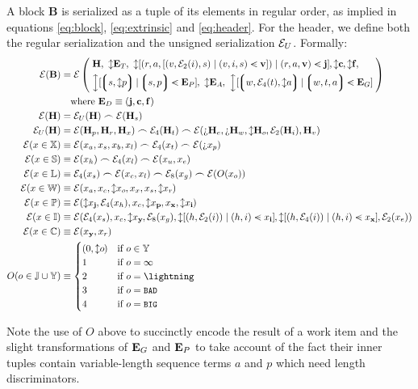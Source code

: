 A block $\mathbf{B}$ is serialized as a tuple of its elements in regular order, as implied in equations \ref{eq:block}, \ref{eq:extrinsic} and \ref{eq:header}. For the header, we define both the regular serialization and the unsigned serialization $\mathcal{E}_U$. Formally:
\begin{align}
  \se(\mathbf{B}) &= \se\,\left\lparen\;\begin{aligned}
    &\mathbf{H},\ 
    \var{\xttickets},\ 
    \var{[(r, a, [(v, \se_2(i), s) \mid (v, i, s) \orderedin \mathbf{v}]) \mid (r, a, \mathbf{v}) \orderedin \mathbf{j}]}, \var{\mathbf{c}}, \var{\mathbf{f}},\ \\
    &\var{[\tup{s, \var{p}} \mid \tup{s, p} \orderedin \xtpreimages]},\ 
    \var{\xtassurances},\ 
    \var{[\tup{w, \se_4(t), \var{a}} \mid \tup{w, t, a} \orderedin \xtguarantees]}
  \end{aligned}\;\right\rparen \\
  \nonumber &\quad \where \xtdisputes \equiv (\mathbf{j}, \mathbf{c}, \mathbf{f}) \\
  \se(\mathbf{H}) &= \se_U(\mathbf{H})\concat\se(\mathbf{H}_s) \\
  \se_U(\mathbf{H}) &= \se(\mathbf{H}_p,\mathbf{H}_r,\mathbf{H}_x)\concat\se_4(\mathbf{H}_t)\concat\se(\maybe{\mathbf{H}_e},\maybe{\mathbf{H}_w},\var{\mathbf{H}_o},\se_2(\mathbf{H}_i),\mathbf{H}_v)\\
  \se(x \in \mathbb{X}) &\equiv \se(x_a, x_s, x_b, x_l)\concat\se_4(x_t)\concat\se(\maybe{x_p})\\
  \se(x \in \mathbb{S}) &\equiv \se(x_h) \concat \se_4(x_l)\concat\se(x_u, x_e) \\
  \se(x \in \mathbb{L}) &\equiv \se_4(x_s)\concat\se(x_c, x_l)\concat\se_8(x_g)\concat\se(O(x_o))\\
  \se(x \in \mathbb{W}) &\equiv \se(x_a, x_c, \var{x_o}, x_x, x_s, \var{x_r}) \\
  \se(x \in \mathbb{P}) &\equiv \se(\var{x_\mathbf{j}}, \se_4(x_h), x_c, \var{x_\mathbf{p}}, x_\mathbf{x}, \var{x_\mathbf{i}}) \\
  \se(x \in \mathbb{I}) &\equiv \se(\se_4(x_s), x_c, \var{x_\mathbf{y}}, \se_8(x_g), \var{\sq{(h, \se_2(i)) \mid (h, i) \orderedin x_\mathbf{i}}}, \var{\sq{(h, \se_4(i)) \mid (h, i) \orderedin x_\mathbf{x}}}, \se_2(x_e)) \\
  \se(x \in \mathbb{C}) &\equiv \se(x_\mathbf{y}, x_r) \\
  O(o \in \mathbb{J} \cup \Y) &\equiv \begin{cases}
    (0, \var{o}) &\when o \in \Y \\
    1 &\when o = \infty \\
    2 &\when o = \panic \\
    3 &\when o = \token{BAD} \\
    4 &\when o = \token{BIG} \\
  \end{cases}
\end{align}

Note the use of $O$ above to succinctly encode the result of a work item and the slight transformations of $\mathbf{E}_G$ and $\mathbf{E}_P$ to take account of the fact their inner tuples contain variable-length sequence terms $a$ and $p$ which need length discriminators.

